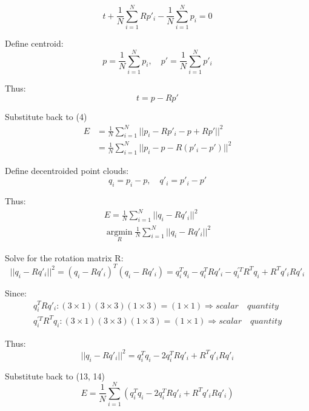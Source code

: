 \documentclass{article}
\begin{document}
\begin{equation}
t+\frac{1}{N}\sum^{N}_{i=1}Rp'_i - \frac{1}{N}\sum^{N}_{i=1}p_i=0
\end{equation}
\par
Define centroid:
\begin{equation}
p = \frac{1}{N}\sum_{i=1}^{N}p_i, \quad p' = \frac{1}{N}\sum_{i=1}^{N}p'_i
\end{equation}
\par
Thus:
\begin{equation}
t = p - Rp'
\end{equation}
\par
Substitute back to (4)
\begin{align}
E&=\frac{1}{N}\sum^{N}_{i=1}||p_i - Rp'_i -p+Rp'||^2\\
&=\frac{1}{N}\sum^{N}_{i=1}||p_i - p- R(p'_i -p')||^2
\end{align}
\par
Define decentroided point clouds:
\begin{equation}
q_i=p_i-p, \quad q'_i=p'_i-p'
\end{equation}
\par
Thus:
\begin{gather}
    E = \frac{1}{N}\sum^{N}_{i=1}||q_i - Rq'_i||^2\\
    \mathop{\arg\min}\limits_{R}\frac{1}{N}\sum^{N}_{i=1}||q_i - Rq'_i||^2
\end{gather}
\par
Solve for the rotation matrix R:
\begin{equation}
||q_i - Rq'_i||^2 = (q_i - Rq'_i)^T(q_i - Rq'_i) = q_i^Tq_i - q_i^TRq'_i - q_i^{\prime T}R^Tq_i + R^Tq'_iRq'_i
\end{equation}
\par
Since:
\begin{gather}
    q_i^TRq'_i: (3 \times 1)(3 \times 3)(1 \times 3)=(1 \times 1) \Rightarrow scalar \quad quantity\\
    q_i^{\prime T}R^Tq_i: (3 \times 1)(3 \times 3)(1 \times 3)=(1 \times 1) \Rightarrow scalar \quad quantity
\end{gather}
\par
Thus:
\begin{equation}
    ||q_i - Rq'_i||^2 = q_i^Tq_i - 2q_i^TRq'_i + R^Tq'_iRq'_i
\end{equation}
\par
Substitute back to (13, 14)
\begin{equation}
    E = \frac{1}{N}\sum^{N}_{i=1}(q_i^Tq_i - 2q_i^TRq'_i + R^Tq'_iRq'_i)
\end{equation}
\end{document}
